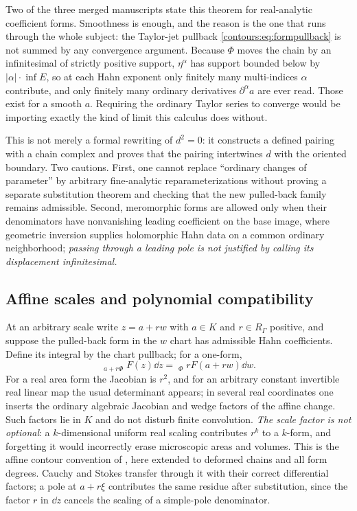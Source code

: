 \documentclass[11pt,letterpaper]{article}
\theoremstyle{definition}
\theoremstyle{remark}
\newcommand{\HInt}{\mathop{\int^{\!H}}\nolimits}
\numberwithin{equation}{section}
\begin{document}
\begin{remark}
Two of the three merged manuscripts state this theorem for real-analytic
coefficient forms. Smoothness is enough, and the reason is the one that runs
through the whole subject: the Taylor-jet pullback
\eqref{contours:eq:formpullback} is not summed by any convergence argument.
Because $\Phi$ moves the chain by an infinitesimal of strictly positive
support, $\eta^\alpha$ has support bounded below by $|\alpha|\cdot\inf E$, so at
each Hahn exponent only finitely many multi-indices $\alpha$ contribute, and
only finitely many ordinary derivatives $\partial^\alpha a$ are ever read.
Those exist for a smooth $a$. Requiring the ordinary Taylor series to converge
would be importing exactly the kind of limit this calculus does without.
\end{remark}

This is not merely a formal rewriting of $d^2=0$: it constructs a defined pairing
with a chain complex and proves that the pairing intertwines $d$ with the oriented
boundary. Two cautions. First, one cannot replace ``ordinary changes of parameter''
by arbitrary fine-analytic reparameterizations without proving a separate
substitution theorem and checking that the new pulled-back family remains
admissible. Second, meromorphic forms are allowed only when their denominators have
nonvanishing leading coefficient on the base image, where geometric inversion
supplies holomorphic Hahn data on a common ordinary neighborhood; \emph{passing
through a leading pole is not justified by calling its displacement
infinitesimal.}

\subsection{Affine scales and polynomial compatibility}
At an arbitrary scale write $z=a+rw$ with $a\in K$ and $r\in R_\Gamma$ positive, and
suppose the pulled-back form in the $w$ chart has admissible Hahn coefficients.
Define its integral by the chart pullback; for a one-form,
\begin{equation}\label{contours:eq:affineintegral}
  \HInt_{a+r\Phi}F(z)\dd z=\HInt_\Phi rF(a+rw)\dd w .
\end{equation}
For a real area form the Jacobian is $r^2$, and for an arbitrary constant invertible
real linear map the usual determinant appears; in several real coordinates one
inserts the ordinary algebraic Jacobian and wedge factors of the affine change.
Such factors lie in $K$ and do not disturb finite convolution. \emph{The scale
factor is not optional}: a $k$-dimensional uniform real scaling contributes $r^k$
to a $k$-form, and forgetting it would incorrectly erase microscopic areas and
volumes. This is the affine contour convention of \cite{Analysis}, here extended to
deformed chains and all form degrees. Cauchy and Stokes transfer through it with
their correct differential factors; a pole at $a+r\xi$ contributes the same residue
after substitution, since the factor $r$ in $\dd z$ cancels the scaling of a simple-pole
denominator.
\end{document}
